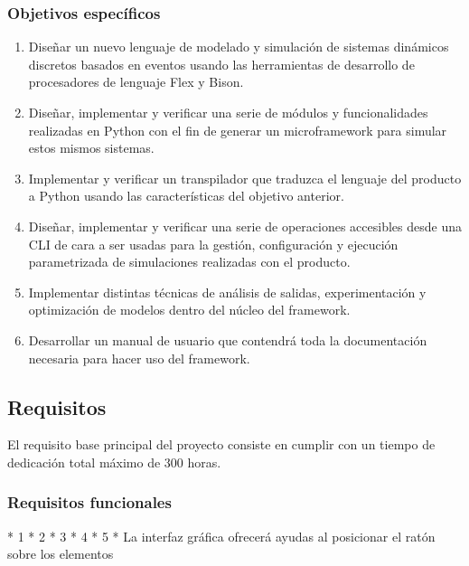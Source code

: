\subsubsection{Objetivos específicos}
\begin{enumerate}
    \item Diseñar un nuevo lenguaje de modelado y simulación de sistemas
    dinámicos discretos basados en eventos usando las herramientas de desarrollo
    de procesadores de lenguaje Flex y Bison.
    \item Diseñar, implementar y verificar una serie de módulos y
    funcionalidades realizadas en Python con el fin de generar un microframework
    para simular estos mismos sistemas.
    \item Implementar y verificar un transpilador que traduzca el lenguaje del
    producto a Python usando las características del objetivo anterior.
    \item Diseñar, implementar y verificar una serie de operaciones accesibles
    desde una CLI de cara a ser usadas para la gestión, configuración y
    ejecución parametrizada de simulaciones realizadas con el producto.
    \item Implementar distintas técnicas de análisis de salidas, experimentación
    y optimización de modelos dentro del núcleo del framework.
    \item Desarrollar un manual de usuario que contendrá toda la documentación
    necesaria para hacer uso del framework.
\end{enumerate}




\subsection{Requisitos}\label{subsec:requisitos}
El requisito base principal del proyecto consiste en cumplir con un tiempo de
dedicación total máximo de 300 horas.

\subsubsection{Requisitos funcionales}

\begin{markdown}
* 1
* 2
* 3
* 4
* 5
* La interfaz gráfica ofrecerá ayudas al posicionar el ratón sobre los elementos
\end{markdown}


